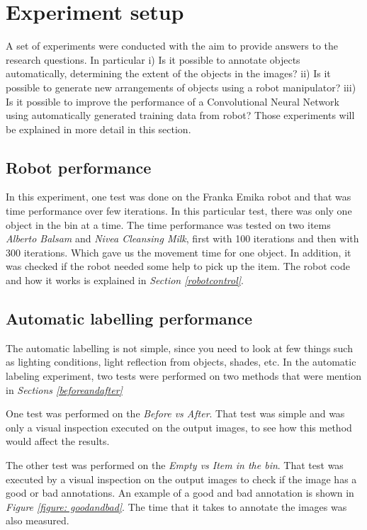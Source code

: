 \section{Experiment setup}
A set of experiments were conducted with the aim to provide answers to the research questions.  In particular i) Is it possible to annotate objects automatically, determining the extent of the objects in the images? ii) Is it possible to generate new arrangements of objects using a robot manipulator? iii) Is it possible to improve the performance of a Convolutional Neural Network using automatically generated training data from robot? Those experiments will be explained in more detail in this section. 
\subsection{Robot performance}
In this experiment, one test was done on the Franka Emika robot and that was time performance over few iterations. In this particular test, there was only one object in the bin at a time. The time performance was tested on two items \textit{Alberto Balsam} and \textit{Nivea Cleansing Milk}, first with 100 iterations and then with 300 iterations. Which gave us the movement time for one object. In addition, it was checked if the robot needed some help to pick up the item. The robot code and how it works is explained in \textit{Section \ref{robotcontrol}}. 

\subsection{Automatic labelling performance}
The automatic labelling is not simple, since you need to look at few things such as lighting conditions, light reflection from objects, shades, etc. 
In the automatic labeling experiment, two tests were performed on two methods that were mention in \textit{Sections \ref{beforeandafter}}

One test was performed on the \textit{Before vs After}. That test was simple and was only a visual inspection executed on the output images, to see how this method would affect the results.

The other test was performed on the \textit{Empty vs Item in the bin}. That test was executed by a visual inspection on the output images to check if the image has a good or bad annotations. An example of a good and bad annotation is shown in \textit{Figure \ref{figure: goodandbad}}. The time that it takes to annotate the images was also measured.

